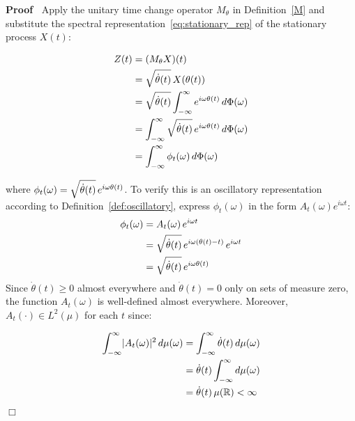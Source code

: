 \documentclass{article}
\newcommand{\cdummy}{\cdot}
\newenvironment{proof}{\noindent\textbf{Proof\ }}{\hspace*{\fill}$\Box$\medskip}
\begin{document}
\begin{proof}
  Apply the unitary time change operator $M_{\theta}$ in Definition~\ref{M}
  and substitute the spectral representation~\eqref{eq:stationary_rep} of the
  stationary process $X (t)$:
  
  \begin{align}
    Z (t) & = (M_{\theta} X) (t) \nonumber\\
    & = \sqrt{\dot{\theta} (t)}  \hspace{0.17em} X (\theta (t)) \\
    & = \sqrt{\dot{\theta} (t)}  \int_{- \infty}^{\infty} e^{i \omega \theta
    (t)}  \hspace{0.17em} d \Phi (\omega) \\
    & = \int_{- \infty}^{\infty} \sqrt{\dot{\theta} (t)}  \hspace{0.17em}
    e^{i \omega \theta (t)}  \hspace{0.17em} d \Phi (\omega) \\
    & = \int_{- \infty}^{\infty} \phi_t (\omega)  \hspace{0.17em} d \Phi
    (\omega) 
  \end{align}
  
  where $\phi_t (\omega) = \sqrt{\dot{\theta} (t)}  \hspace{0.17em} e^{i
  \omega \theta (t)}$. To verify this is an oscillatory representation
  according to Definition~\ref{def:oscillatory}, express $\phi_t (\omega)$ in
  the form $A_t (\omega) e^{i \omega t}$:
  \begin{equation}
    \begin{aligned}
      \phi_t (\omega) & = A_t (\omega)  \hspace{0.17em} e^{i \omega t}\\
      & = \sqrt{\dot{\theta} (t)}  \hspace{0.17em} e^{i \omega (\theta (t) -
      t)}  \hspace{0.17em} e^{i \omega t}\\
      & = \sqrt{\dot{\theta} (t)}  \hspace{0.17em} e^{i \omega \theta (t)}
    \end{aligned}
  \end{equation}
  Since $\dot{\theta} (t) \geq 0$ almost everywhere and $\dot{\theta} (t) = 0$
  only on sets of measure zero, the function $A_t (\omega)$ is well-defined
  almost everywhere. Moreover, $A_t (\cdummy) \in L^2 (\mu)$ for each $t$
  since:
  
  \begin{align}
    \int_{- \infty}^{\infty} \lvert A_t (\omega) \rvert^2  \hspace{0.17em} d
    \mu (\omega) & = \int_{- \infty}^{\infty} \dot{\theta} (t) 
    \hspace{0.17em} d \mu (\omega) \\
    & = \dot{\theta} (t)  \int_{- \infty}^{\infty} d \mu (\omega) \\
    & = \dot{\theta} (t)  \hspace{0.17em} \mu (\mathbb{R}) < \infty 
  \end{align}
  

\end{proof}
\end{document}
